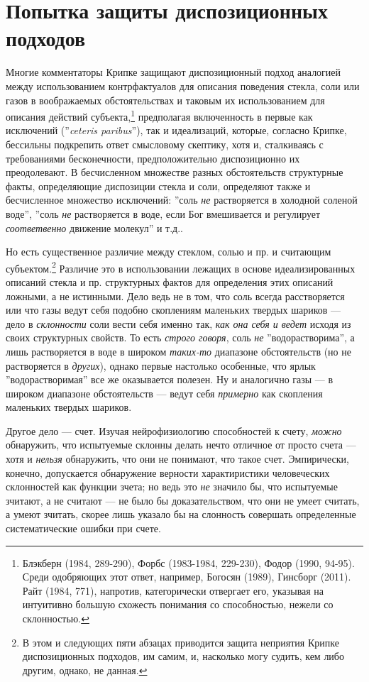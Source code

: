 \documentclass[11pt]{book}
\begin{document}
\section{Попытка защиты диспозиционных подходов}

Многие комментаторы Крипке защищают диспозиционный подход аналогией между использованием контрфактуалов для описания поведения стекла, соли или газов в воображаемых обстоятельствах и таковым их использованием для описания действий субъекта,\footnote{Блэкберн (1984, 289-290), Форбс (1983-1984, 229-230), Фодор (1990, 94-95). Среди одобряющих этот ответ, например, Богосян (1989), Гинсборг (2011). Райт (1984, 771), напротив, категорически отвергает его, указывая на интуитивно большую схожесть понимания со способностью, нежели со склонностью.} предполагая включенность в первые как исключений (''\textit{ceteris paribus}''), так и идеализаций, которые, согласно Крипке, бессильны подкрепить ответ смысловому скептику, хотя и, сталкиваясь с требованиями бесконечности, предположительно диспозиционно их преодолевают. В бесчисленном множестве разных обстоятельств структурные факты, определяющие диспозиции стекла и соли, определяют также и бесчисленное множество исключений: ''соль \textit{не} растворяется в холодной соленой воде'', ''соль \textit{не} растворяется в воде, если Бог вмешивается и регулирует \textit{соответвенно} движение молекул'' и т.д..

Но есть существенное различие между стеклом, солью и пр. и считающим субъектом.\footnote{В этом и следующих пяти абзацах приводится защита неприятия Крипке диспозиционных подходов, им самим, и, насколько могу судить, кем либо другим, однако, не данная.} Различие это в использовании лежащих в основе идеализированных описаний стекла и пр. структурных фактов для определения этих описаний ложными, а не истинными. Дело ведь не в том, что соль всегда расстворяется или что газы ведут себя подобно скоплениям маленьких твердых шариков --- дело в \textit{склонности} соли вести себя именно так, \textit{как она себя и ведет} исходя из своих структурных свойств. То есть \textit{строго говоря}, соль \textit{не} ''водорастворима'', а лишь растворяется в воде в широком \textit{таких-то} диапазоне обстоятельств (но не растворяется в \textit{других}), однако первые настолько особенные, что ярлык ''водорастворимая'' все же оказывается полезен. Ну и аналогично газы --- в широком диапазоне обстоятельств --- ведут себя \textit{примерно} как скопления маленьких твердых шариков.

Другое дело --- счет. Изучая нейрофизиологию способностей к счету, \textit{можно} обнаружить, что испытуемые склонны делать нечто отличное от просто счета --- хотя и \textit{нельзя} обнаружить, что они не понимают, что такое счет. Эмпирически, конечно, допускается обнаружение верности характиристики человеческих склонностей как функции зчета; но ведь это \textit{не} значило бы, что испытуемые зчитают, а не считают --- не было бы доказательством, что они не умеет считать, а умеют зчитать, скорее лишь указало бы на слонность совершать определенные систематические ошибки при счете.
\end{document}
